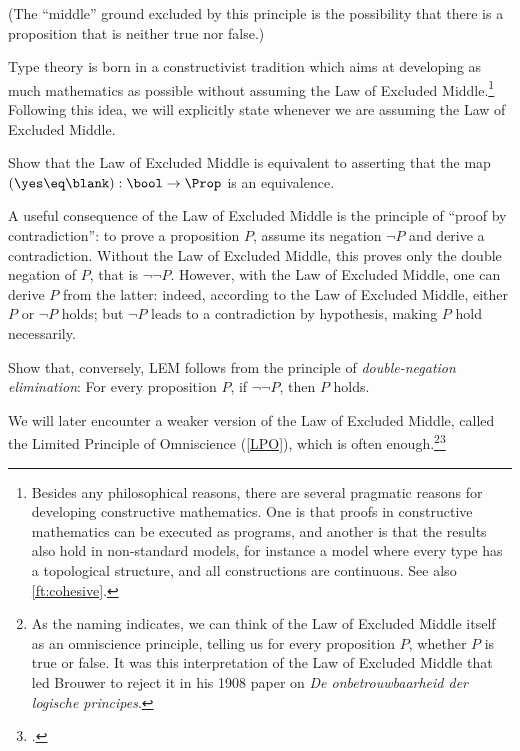 (The ``middle'' ground excluded by this principle is the possibility that there
is a proposition that is neither true nor false.)

Type theory is born
in a constructivist tradition
which aims at developing as much mathematics as
possible without assuming the Law of Excluded Middle.\footnote{%
  Besides any philosophical reasons,
  there are several pragmatic reasons
  for developing constructive mathematics.
  One is that proofs in constructive mathematics
  can be executed as programs,
  and another is that the results also hold in non-standard models,
  for instance a model where every type has a topological structure,
  and all constructions are continuous.
  See also \cref{ft:cohesive}.}
Following this idea, we will
explicitly state whenever we are assuming the Law of Excluded Middle.
\begin{xca}\label{xca:lem-prop}
  Show that the Law of Excluded Middle is equivalent to asserting
  that the map $(\yes \eq \blank) : \bool \to \Prop$
  is an equivalence.
\end{xca}
A useful consequence of the Law of Excluded Middle is the principle of
``proof by contradiction'': to prove a proposition $P$,
assume its negation $\neg P$ and derive a contradiction.
Without the Law of Excluded Middle, this proves only the double negation of
$P$, that is $\neg \neg P$.  However, with the Law of Excluded Middle,
one can derive $P$ from the latter: indeed, according to the
Law of Excluded Middle, either $P$ or $\neg P$ holds;
but $\neg P$ leads to a contradiction by hypothesis, making $P$ hold
necessarily.


\begin{xca}\label{xca:dne-lem}
  Show that, conversely, LEM follows from the principle of
  \emph{double-negation elimination}:
  For every proposition $P$, if $\neg \neg P$, then $P$ holds.
\end{xca}

\begin{remark}
  We will later encounter a weaker version of the Law of Excluded Middle, called the Limited
  Principle of Omniscience (\cref{LPO}), which is often enough.\footnote{%
    As the naming indicates, we can think of the Law of Excluded Middle itself as an omniscience
    principle, telling us for every proposition $P$,
    whether $P$ is true or false.
    It was this interpretation of the Law of Excluded Middle that led Brouwer to reject it
    in his 1908 paper on \emph{De onbetrouwbaarheid der logische
      principes}.\footnotemark{}}\footcitetext{Brouwer-1908}
\end{remark}

